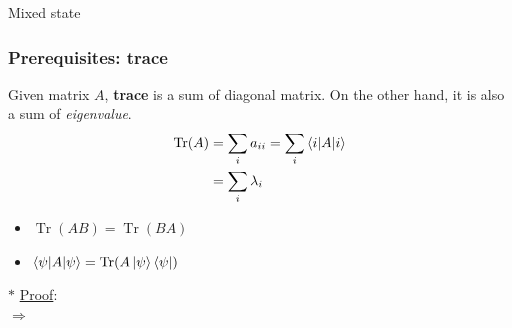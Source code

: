 \documentclass[9pt]{beamer}
\begin{document}
    \begin{section}{Mixed state}
        \begin{frame}
            \frametitle{Prerequisites: trace}
            \begin{definition}[trace]
                Given matrix $A$, \textbf{trace} is a sum of diagonal matrix. On the other hand, it is also a sum of \textit{eigenvalue}.
                $$\begin{aligned} \operatorname{Tr}(A) & = \sum_{i} a_{ii} = \sum_{i} \braket{i|A|i} \\ &= \sum_i \lambda_i \end{aligned}$$
            \end{definition}
            \begin{theorem}
                \begin{itemize}
                    \item $\operatorname{Tr}(AB) = \operatorname{Tr}(BA)$
                    \item $\braket{\psi | A | \psi} = \operatorname{Tr}(A \ket \psi \bra \psi)$
                \end{itemize}
            \end{theorem}
            $\ast$ \underline{Proof}:
            \\$\Rightarrow$
            \vspace{1cm}
        \end{frame}


\end{section}
\end{document}

